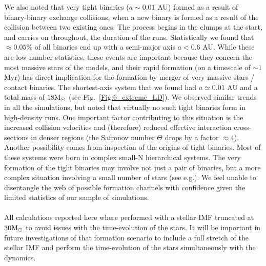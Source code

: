 We also noted that very tight binaries ($a \sim 0.01 $ AU) formed as a result of binary-binary exchange collisions, when a new binary is formed as a result of the collision between two existing ones. The process begins in the clumps at the start, and carries on throughout, the duration of the runs. Statistically we found that $\approx 0.05\%$ of all binaries end up with  a semi-major axis $a < 0.6$ AU. While these are low-number statistics, these events are important because they concern the most massive stars of the models, and their rapid formation (on  a timescale of $\sim 1 $ Myr) has direct implication for the formation by merger of very massive stars / contact binaries. The shortest-axis system that we found had $a \simeq 0.01 $ AU and a total mass of $18{\textrm{M}_\odot}$ (see Fig.~\ref{Fig:6_extreme_LD}).  We observed similar trends in all the simulations, but noted that  virtually no such tight binaries form in high-density runs.  One important factor contributing to this situation is  the increased collision velocities and (therefore) reduced effective interaction cross-sections in denser regions (the Safronov number $\Theta$ drops by a factor $\approx 4$). Another possibility comes from inspection of the origins of tight binaries. Most of these systems were born in complex small-N hierarchical systems. The very formation of the tight binaries may involve not just  a pair of binaries, but a more complex situation involving a small number of stars (see e.g.\citealt{Leigh2013,Geller2015}). We feel unable to disentangle the web of possible formation channels with confidence given the limited statistics of our sample of simulations. 

\paragraph*{}
All  calculations  reported here where performed with a stellar IMF truncated at $30 {\textrm{M}_\odot}$ to avoid issues with the time-evolution of the stars. It will be important in future investigations of that formation scenario to include a full stretch of the stellar IMF and perform the time-evolution of the 
stars simultaneously with the dynamics. 
